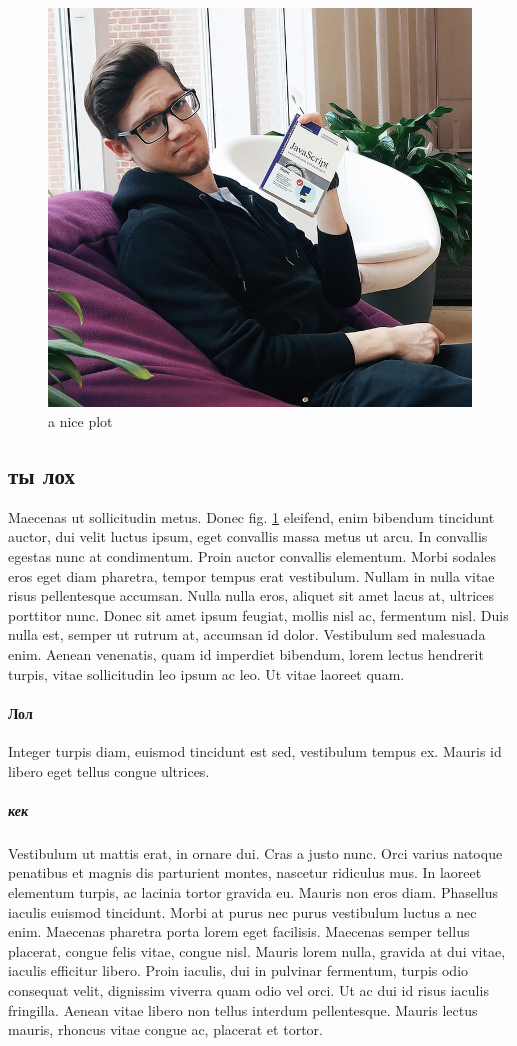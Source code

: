 \documentclass[9pt, letterpaper, twocolumn]{article}
\begin{document}
\begin{figure}[h]
  \centering
  \includegraphics[width=0.9\linewidth]{0VJVtV47xpk}
  \caption{a nice plot}
  \label{fig:mesh1}
\end{figure}

\subsection{ты лох}
Maecenas ut sollicitudin metus. Donec fig. \ref{fig:mesh1} eleifend, enim bibendum tincidunt auctor, dui velit luctus ipsum, eget convallis massa metus ut arcu. In convallis egestas nunc at condimentum. Proin auctor convallis elementum. Morbi sodales eros eget diam pharetra, tempor tempus erat vestibulum. Nullam in nulla vitae risus pellentesque accumsan. Nulla nulla eros, aliquet sit amet lacus at, ultrices porttitor nunc. Donec sit amet ipsum feugiat, mollis nisl ac, fermentum nisl. Duis nulla est, semper ut rutrum at, accumsan id dolor. Vestibulum sed malesuada enim. Aenean venenatis, quam id imperdiet bibendum, lorem lectus hendrerit turpis, vitae sollicitudin leo ipsum ac leo. Ut vitae laoreet quam.
\paragraph{Лол}
Integer turpis diam, euismod tincidunt est sed, vestibulum tempus ex. Mauris id libero eget tellus congue ultrices.
\subparagraph{кек} Vestibulum ut mattis erat, in ornare dui. Cras a justo nunc. Orci varius natoque penatibus et magnis dis parturient montes, nascetur ridiculus mus. In laoreet elementum turpis, ac lacinia tortor gravida eu. Mauris non eros diam. Phasellus iaculis euismod tincidunt. Morbi at purus nec purus vestibulum luctus a nec enim. Maecenas pharetra porta lorem eget facilisis. Maecenas semper tellus placerat, congue felis vitae, congue nisl. Mauris lorem nulla, gravida at dui vitae, iaculis efficitur libero. Proin iaculis, dui in pulvinar fermentum, turpis odio consequat velit, dignissim viverra quam odio vel orci. Ut ac dui id risus iaculis fringilla. Aenean vitae libero non tellus interdum pellentesque. Mauris lectus mauris, rhoncus vitae congue ac, placerat et tortor.
\end{document}
